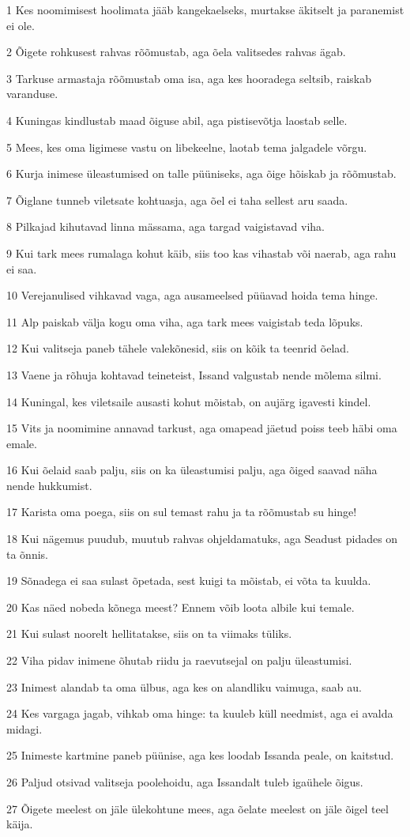 \par 1 Kes noomimisest hoolimata jääb kangekaelseks, murtakse äkitselt ja paranemist ei ole.
\par 2 Õigete rohkusest rahvas rõõmustab, aga õela valitsedes rahvas ägab.
\par 3 Tarkuse armastaja rõõmustab oma isa, aga kes hooradega seltsib, raiskab varanduse.
\par 4 Kuningas kindlustab maad õiguse abil, aga pistisevõtja laostab selle.
\par 5 Mees, kes oma ligimese vastu on libekeelne, laotab tema jalgadele võrgu.
\par 6 Kurja inimese üleastumised on talle püüniseks, aga õige hõiskab ja rõõmustab.
\par 7 Õiglane tunneb viletsate kohtuasja, aga õel ei taha sellest aru saada.
\par 8 Pilkajad kihutavad linna mässama, aga targad vaigistavad viha.
\par 9 Kui tark mees rumalaga kohut käib, siis too kas vihastab või naerab, aga rahu ei saa.
\par 10 Verejanulised vihkavad vaga, aga ausameelsed püüavad hoida tema hinge.
\par 11 Alp paiskab välja kogu oma viha, aga tark mees vaigistab teda lõpuks.
\par 12 Kui valitseja paneb tähele valekõnesid, siis on kõik ta teenrid õelad.
\par 13 Vaene ja rõhuja kohtavad teineteist, Issand valgustab nende mõlema silmi.
\par 14 Kuningal, kes viletsaile ausasti kohut mõistab, on aujärg igavesti kindel.
\par 15 Vits ja noomimine annavad tarkust, aga omapead jäetud poiss teeb häbi oma emale.
\par 16 Kui õelaid saab palju, siis on ka üleastumisi palju, aga õiged saavad näha nende hukkumist.
\par 17 Karista oma poega, siis on sul temast rahu ja ta rõõmustab su hinge!
\par 18 Kui nägemus puudub, muutub rahvas ohjeldamatuks, aga Seadust pidades on ta õnnis.
\par 19 Sõnadega ei saa sulast õpetada, sest kuigi ta mõistab, ei võta ta kuulda.
\par 20 Kas näed nobeda kõnega meest? Ennem võib loota albile kui temale.
\par 21 Kui sulast noorelt hellitatakse, siis on ta viimaks tüliks.
\par 22 Viha pidav inimene õhutab riidu ja raevutsejal on palju üleastumisi.
\par 23 Inimest alandab ta oma ülbus, aga kes on alandliku vaimuga, saab au.
\par 24 Kes vargaga jagab, vihkab oma hinge: ta kuuleb küll needmist, aga ei avalda midagi.
\par 25 Inimeste kartmine paneb püünise, aga kes loodab Issanda peale, on kaitstud.
\par 26 Paljud otsivad valitseja poolehoidu, aga Issandalt tuleb igaühele õigus.
\par 27 Õigete meelest on jäle ülekohtune mees, aga õelate meelest on jäle õigel teel käija.


